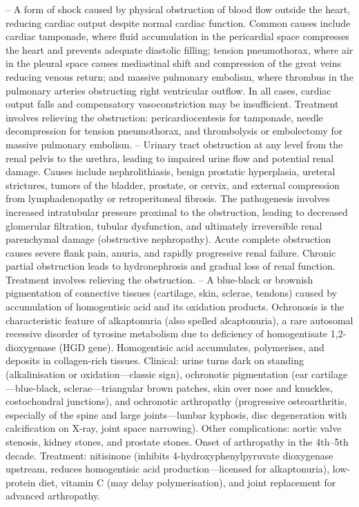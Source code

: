 -- A form of shock caused by physical obstruction of blood flow outside the heart, reducing cardiac output despite normal cardiac function. Common causes include cardiac tamponade, where fluid accumulation in the pericardial space compresses the heart and prevents adequate diastolic filling; tension pneumothorax, where air in the pleural space causes mediastinal shift and compression of the great veins reducing venous return; and massive pulmonary embolism, where thrombus in the pulmonary arteries obstructing right ventricular outflow. In all cases, cardiac output falls and compensatory vasoconstriction may be insufficient. Treatment involves relieving the obstruction: pericardiocentesis for tamponade, needle decompression for tension pneumothorax, and thrombolysis or embolectomy for massive pulmonary embolism.
-- Urinary tract obstruction at any level from the renal pelvis to the urethra, leading to impaired urine flow and potential renal damage. Causes include nephrolithiasis, benign prostatic hyperplasia, ureteral strictures, tumors of the bladder, prostate, or cervix, and external compression from lymphadenopathy or retroperitoneal fibrosis. The pathogenesis involves increased intratubular pressure proximal to the obstruction, leading to decreased glomerular filtration, tubular dysfunction, and ultimately irreversible renal parenchymal damage (obstructive nephropathy). Acute complete obstruction causes severe flank pain, anuria, and rapidly progressive renal failure. Chronic partial obstruction leads to hydronephrosis and gradual loss of renal function. Treatment involves relieving the obstruction.
-- A blue-black or brownish pigmentation of connective tissues (cartilage, skin, sclerae, tendons) caused by accumulation of homogentisic acid and its oxidation products. Ochronosis is the characteristic feature of alkaptonuria (also spelled alcaptonuria), a rare autosomal recessive disorder of tyrosine metabolism due to deficiency of homogentisate 1,2-dioxygenase (HGD gene). Homogentisic acid accumulates, polymerises, and deposits in collagen-rich tissues. Clinical: urine turns dark on standing (alkalinisation or oxidation—classic sign), ochronotic pigmentation (ear cartilage—blue-black, sclerae—triangular brown patches, skin over nose and knuckles, costochondral junctions), and ochronotic arthropathy (progressive osteoarthritis, especially of the spine and large joints—lumbar kyphosis, disc degeneration with calcification on X-ray, joint space narrowing). Other complications: aortic valve stenosis, kidney stones, and prostate stones. Onset of arthropathy in the 4th--5th decade. Treatment: nitisinone (inhibits 4-hydroxyphenylpyruvate dioxygenase upstream, reduces homogentisic acid production—licensed for alkaptonuria), low-protein diet, vitamin C (may delay polymerisation), and joint replacement for advanced arthropathy.
